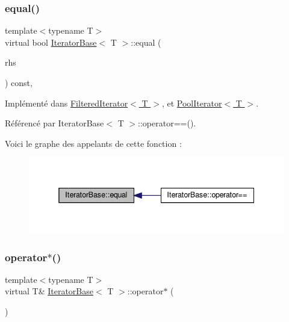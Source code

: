 \subsubsection{\texorpdfstring{equal()}{equal()}}
{\footnotesize\ttfamily template$<$typename T$>$ \\
virtual bool \hyperlink{class_iterator_base}{Iterator\+Base}$<$ T $>$\+::equal (\begin{DoxyParamCaption}\item[{const \hyperlink{class_iterator_base}{Iterator\+Base}$<$ T $>$ \&}]{rhs }\end{DoxyParamCaption}) const\hspace{0.3cm}{\ttfamily [protected]}, {}}



Implémenté dans \hyperlink{class_filtered_iterator_a7118ec2bba2bf138ca771a394a8d72c8}{Filtered\+Iterator$<$ T $>$}, et \hyperlink{class_pool_iterator_adbbef39e72972414b1bbb6d6bb885bb1}{Pool\+Iterator$<$ T $>$}.



Référencé par Iterator\+Base$<$ T $>$\+::operator==().

Voici le graphe des appelants de cette fonction \+:\nopagebreak
\begin{figure}[H]
\begin{center}
\leavevmode
\includegraphics[width=338pt]{class_iterator_base_a08430515a17384d098eb62ecce1b64c6_icgraph}
\end{center}
\end{figure}
\mbox{\label{class_iterator_base_a532583e58bce168648bdbdedb3a7d5ab}} 
\subsubsection{\texorpdfstring{operator$\ast$()}{operator*()}\hspace{0.1cm}{\footnotesize\ttfamily [1/2]}}
{\footnotesize\ttfamily template$<$typename T$>$ \\
virtual T\& \hyperlink{class_iterator_base}{Iterator\+Base}$<$ T $>$\+::operator$\ast$ (\begin{DoxyParamCaption}{ }\end{DoxyParamCaption})\hspace{0.3cm}{\ttfamily [pure virtual]}}



